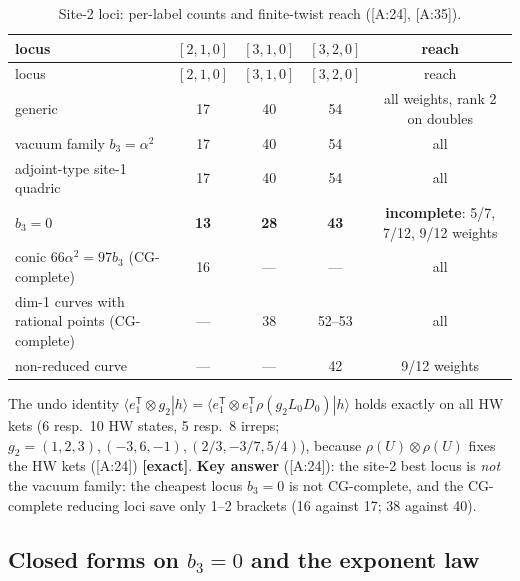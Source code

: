 \documentclass[10pt]{article}
\newcommand{\cl}[2]{\textsf{[#1:#2]}}
\newcommand{\tg}[1]{\textbf{[#1]}}
\begin{document}
\begin{center}\small\setlength{\tabcolsep}{4pt}\begin{longtable}{@{}p{6.4cm}cccc@{}}
\caption{Site-2 loci: per-label counts and finite-twist reach (\cl{A}{24}, \cl{A}{35}).}\label{tab:Aloci}\\\toprule
locus & $[2,1,0]$ & $[3,1,0]$ & $[3,2,0]$ & reach \\\midrule\endfirsthead
locus & $[2,1,0]$ & $[3,1,0]$ & $[3,2,0]$ & reach \\\midrule\endhead
generic & 17 & 40 & 54 & all weights, rank 2 on doubles \\
vacuum family $b_3=\alpha^2$ & 17 & 40 & 54 & all \\
adjoint-type site-1 quadric & 17 & 40 & 54 & all \\
$b_3=0$ & \textbf{13} & \textbf{28} & \textbf{43} & \textbf{incomplete}: 5/7, 7/12, 9/12 weights \\
conic $66\alpha^2=97b_3$ (CG-complete) & 16 & --- & --- & all \\
dim-1 curves with rational points (CG-complete) & --- & 38 & 52--53 & all \\
non-reduced curve & --- & --- & 42 & 9/12 weights \\
\bottomrule
\end{longtable}\end{center}

The undo identity $\langle e_1^{\mathsf T}\otimes g_2|h\rangle=\langle e_1^{\mathsf T}\otimes e_1^{\mathsf T}\rho(g_2L_0D_0)|h\rangle$ holds exactly on all HW kets (6 resp.\ 10 HW states, 5 resp.\ 8 irreps; $g_2=(1,2,3),(-3,6,-1),(2/3,-3/7,5/4)$), because $\rho(U)\otimes\rho(U)$ fixes the HW kets (\cl{A}{24}) \tg{exact}. \textbf{Key answer} (\cl{A}{24}): the site-2 best locus is \emph{not} the vacuum family: the cheapest locus $b_3=0$ is not CG-complete, and the CG-complete reducing loci save only 1--2 brackets (16 against 17; 38 against 40).

\subsection{Closed forms on $b_3=0$ and the exponent law}\label{sec:Aclosed}
\end{document}
